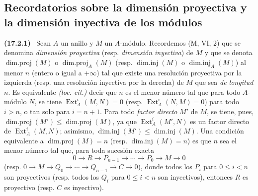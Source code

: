 \documentclass[10pt,oneside]{book}
\makeatletter
\newcommand{\setmanualcurrentlabel}[1]{\def\@currentlabel{#1}}
\newenvironment{env}[1][]{\setmanualcurrentlabel{#1}\par\medskip\noindent\textbf{(#1)}\ }{\par}
\makeatother
\begin{document}
\subsection{Recordatorios sobre la dimensión proyectiva y la dimensión inyectiva de los
módulos}
\label{subsection:0.17.2-es}

\begin{env}[17.2.1]
\label{0.17.2.1-es}
Sean $A$ un anillo y $M$ un $A$-módulo. Recordemos (M, VI, 2) que se denomina
\emph{dimensión proyectiva} (resp. \emph{dimensión inyectiva}) de $M$ y que
se denota $\operatorname{dim.proj}(M)$ o
$\operatorname{dim.proj}_A(M)$ (resp. $\operatorname{dim.inj}(M)$ o
$\operatorname{dim.inj}_A(M)$) al menor $n$ (entero o igual a $+\infty$)
tal que existe una resolución proyectiva por la izquierda (resp. una resolución
inyectiva por la derecha) de $M$ que sea \emph{de longitud $n$}. Es equivalente
\emph{(loc. cit.)} decir que $n$ es el menor número tal que para todo
$A$-módulo $N$, se tiene $\operatorname{Ext}^i_A(M,N)=0$ (resp.
$\operatorname{Ext}^i_A(N,M)=0$) para todo $i>n$, o tan solo para $i=n+1$.
Para todo \emph{factor directo} $M'$ de $M$, se tiene, pues,
$\operatorname{dim.proj}(M')\leq\operatorname{dim.proj}(M)$, ya que
$\operatorname{Ext}^i_A(M',N)$ es un factor directo de
$\operatorname{Ext}^i_A(M,N)$; asimismo,
$\operatorname{dim.inj}(M')\leq\operatorname{dim.inj}(M)$. Una condición
equivalente a $\operatorname{dim.proj}(M)=n$ (resp.
$\operatorname{dim.inj}(M)=n$) es que $n$ sea el menor número tal que,
para toda sucesión exacta
\[
  0\longrightarrow R\longrightarrow P_{n-1}\longrightarrow\cdots
  \longrightarrow P_0\longrightarrow M\longrightarrow0
\]
(resp.
$0\longrightarrow M\longrightarrow Q_0\longrightarrow\cdots
\longrightarrow Q_{n-1}\longrightarrow C\longrightarrow0$), donde todos los
$P_i$ para $0\leq i<n$ son proyectivos (resp. todos los $Q_i$ para $0\leq i<n$
son inyectivos), entonces $R$ es proyectivo (resp. $C$ es inyectivo).
\end{env}
\end{document}
